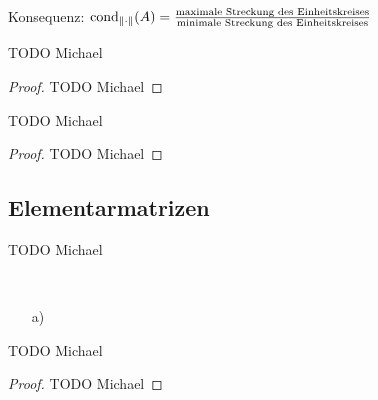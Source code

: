 Konsequenz: $\mathrm{cond}_{\| \cdot \|}(A) = \frac{\text{maximale Streckung des Einheitskreises}}
{\text{minimale Streckung des Einheitskreises}}$

\begin{Lemma}[Störungslemma]
  TODO Michael
\end{Lemma}
\begin{proof}
  TODO Michael
\end{proof}

\begin{Satz}
  TODO Michael
\end{Satz}
\begin{proof}
  TODO Michael
\end{proof}

\subsection{Elementarmatrizen}

\begin{Definition}
  TODO Michael
\end{Definition}

\begin{Bemerkungen}
\quad \\
  \begin{enumerate}
    \item[a)]
  \end{enumerate}
\end{Bemerkungen}

\begin{Lemma}
  TODO Michael
\end{Lemma}
\begin{proof}
  TODO Michael
\end{proof}


